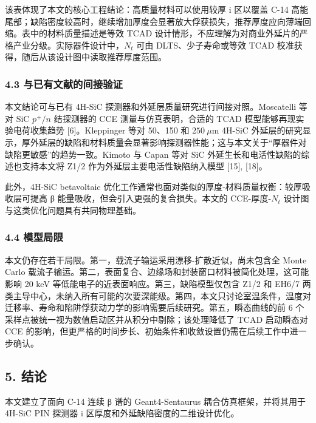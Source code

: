\documentclass[
  10pt,
  a4paper,
]{ctexart}
\begin{document}
该表体现了本文的核心工程结论：高质量材料可以使用较厚 i 区以覆盖 C-14
高能尾部；缺陷密度较高时，继续增加厚度会显著放大俘获损失，推荐厚度应向薄端回缩。表中的材料质量描述是等效
TCAD
设计情形，不应理解为对商业外延片的严格产业分级。实际器件设计中，\(N_t\)
可由 DLTS、少子寿命或等效 TCAD
校准获得，随后从该设计图中读取推荐厚度范围。

\subsubsection{4.3
与已有文献的间接验证}\label{ux4e0eux5df2ux6709ux6587ux732eux7684ux95f4ux63a5ux9a8cux8bc1}

本文结论可与已有 4H-SiC 探测器和外延层质量研究进行间接对照。Moscatelli
等对 SiC \(p^+/n\) 结探测器的 CCE 测量与仿真表明，合适的 TCAD
模型能够再现实验电荷收集趋势 {[}6{]}。Kleppinger 等对 50、150 和
\(250\ \mu\mathrm{m}\) 4H-SiC
外延层的研究显示，厚外延层的缺陷和材料质量会显著影响探测器性能；这与本文关于``厚器件对缺陷更敏感''的趋势一致。Kimoto
与 Capan 等对 SiC 外延生长和电活性缺陷的综述也支持本文将 Z1/2
作为外延层主要电活性缺陷纳入模型 {[}15{]}, {[}18{]}。

此外，4H-SiC betavoltaic
优化工作通常也面对类似的厚度-材料质量权衡：较厚吸收层可提高 β
能量吸收，但会引入更强的复合损失。本文的 CCE-厚度-\(N_t\)
设计图与这类优化问题具有共同物理基础。

\subsubsection{4.4 模型局限}\label{ux6a21ux578bux5c40ux9650}

本文仍存在若干局限。第一，载流子输运采用漂移-扩散近似，尚未包含全 Monte
Carlo
载流子输运。第二，表面复合、边缘场和封装窗口材料被简化处理，这可能影响
20 keV 等低能电子的近表面响应。第三，缺陷模型仅包含 Z1/2 和 EH6/7
两类主导中心，未纳入所有可能的次要深能级。第四，本文只讨论室温条件，温度对迁移率、寿命和陷阱俘获动力学的影响需要后续研究。第五，瞬态曲线的前
6 个采样点被统一视为数值启动区并从积分中剔除；该处理降低了 TCAD
启动瞬态对 CCE
的影响，但更严格的时间步长、初始条件和收敛设置仍需在后续工作中进一步确认。

\subsection{5. 结论}\label{ux7ed3ux8bba}

本文建立了面向 C-14 连续 β 谱的 Geant4-Sentaurus
耦合仿真框架，并将其用于 4H-SiC PIN 探测器 i
区厚度和外延缺陷密度的二维设计优化。
\end{document}
